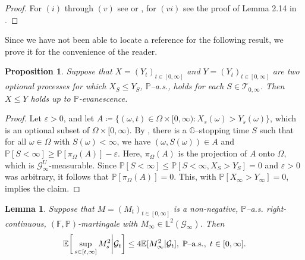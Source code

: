 \documentclass[10pt]{article} %
\newtheorem{lemma}[theorem]{Lemma}
\newtheorem{proposition}[theorem]{Proposition}
\newcommand\cG{\mathcal G}
\newcommand\cT{\mathcal T}
\def \E{\mathbb{E}}
\def \F{\mathbb{F}}
\def \G{\mathbb{G}}
\def \L{\mathbb{L}}
\def \P{\mathbb{P}}
\newcommand{\1}{\mathbf{1}}
\begin{document}
\begin{proof}
	For $(i)$ through $(v)$ see \cite[page 119--120]{dellacherie1982probabilities} or \cite[page 21--22]{he1992semimartingale}, for $(vi)$ see the proof of Lemma 2.14 in \cite{papapantoleon2018existence}.
\end{proof}

Since we have not been able to locate a reference for the following result, we prove it for the convenience of the reader.

\begin{proposition}\label{prop::optional_ineq}
	Suppose that $X = (Y_t)_{t \in [0,\infty]}$ and $Y = (Y_t)_{t \in [0,\infty]}$ are two optional processes for which $X_S \leq Y_S$, $\P${\rm--a.s.}, holds for each $S \in \cT_{0,\infty}$. Then $X \leq Y$ holds up to $\P$-evanescence.
\end{proposition}

\begin{proof}
	Let $\varepsilon > 0$, and let $A \coloneqq \{(\omega,t) \in \Omega \times [0,\infty) : X_s(\omega) > Y_s(\omega) \}$, which is an optional subset of $\Omega \times [0,\infty)$. By \cite[Theorem IV.84]{ dellacherie1978probabilities}, there is a $\G$--stopping time $S$ such that for all $\omega \in \Omega$ with $S(\omega) < \infty$, we have $(\omega,S(\omega)) \in A $ and $\P[S < \infty] \geq \P[\pi_\Omega(A)] - \varepsilon.$ Here, $\pi_\Omega(A)$ is the projection of $A$ onto $\Omega$, which is $\cG^U_\infty$-measurable. Since $\P[S < \infty] \leq \P[S < \infty, X_S > Y_S] = 0$ and $\varepsilon > 0$ was arbitrary, it follows that $\P[\pi_\Omega(A)] = 0$. This, with $\P[X_\infty > Y_\infty] = 0$, implies the claim.
\end{proof}


\begin{lemma}\label{lem::cond_doob}
	Suppose that $M = (M_t)_{t \in [0,\infty]}$ is a non-negative, $\P${\rm--a.s.} right-continuous, $(\F,\P)$-martingale with $M_\infty \in \L^2(\cG_\infty)$. Then
	\begin{equation*}
		\E \bigg[ \sup_{s \in [t,\infty]} M^2_s \bigg| \cG_t \bigg] \leq 4 \E[ M^2_\infty | \cG_t ], \; \textnormal{$\P$--a.s.}, \; t \in [0,\infty].
	\end{equation*}
\end{lemma}
\end{document}
